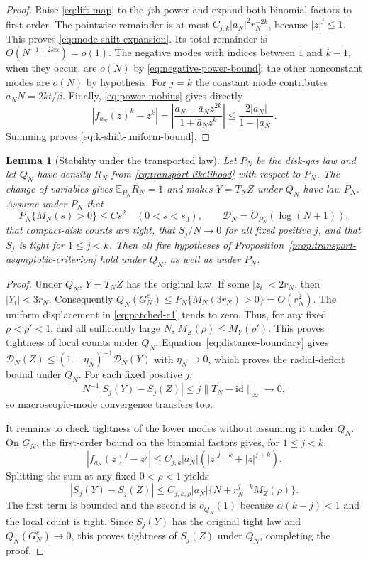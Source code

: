 \documentclass[11pt,a4paper]{article}
\numberwithin{equation}{section}
\newtheorem{lemma}[theorem]{Lemma}
\theoremstyle{definition}
\theoremstyle{remark}
\begin{document}
\begin{proof}
Raise \eqref{eq:lift-map} to the $j$th power and expand both binomial
factors to first order. The pointwise remainder is at most
$C_{j,k}|a_N|^2r_N^{-2k}$, because $|z|^j\leq1$.
This proves \eqref{eq:mode-shift-expansion}. Its total remainder is
$O(N^{-1+2k\alpha})=o(1)$. The negative modes with indices between
$1$ and $k-1$, when they occur, are $o(N)$ by
\eqref{eq:negative-power-bound}; the other nonconstant modes are
$o(N)$ by hypothesis. For $j=k$ the constant mode contributes
$a_NN=2kt/\beta$.
Finally, \eqref{eq:power-mobius} gives directly
\[
 |f_{a_N}(z)^k-z^k|
 =\left|\frac{a_N-\bar a_Nz^{2k}}{1+\bar a_Nz^k}\right|
 \leq\frac{2|a_N|}{1-|a_N|}.
\]
Summing proves \eqref{eq:k-shift-uniform-bound}.
\end{proof}

\begin{lemma}[Stability under the transported law]
\label{lem:transported-controls}
Let $P_N$ be the disk-gas law and let $Q_N$ have density
$R_N$ from \eqref{eq:transport-likelihood} with respect to $P_N$.
The change of variables gives $\mathbb E_{P_N}R_N=1$ and makes
$Y=T_N Z$ under $Q_N$ have law $P_N$. Assume under $P_N$ that
\[
 P_N\{M_N(s)>0\}\leq C s^2\quad(0<s<s_0),\qquad
 \mathcal D_N=O_{P_N}(\log(N+1)),
\]
that compact-disk counts are tight, that $S_j/N\to0$ for all fixed
positive $j$, and that $S_j$ is tight for $1\leq j<k$.
Then all five hypotheses of
Proposition~\ref{prop:transport-asymptotic-criterion} hold under $Q_N$,
as well as under $P_N$.
\end{lemma}

\begin{proof}
Under $Q_N$, $Y=T_N Z$ has the original law. If some $|z_i|<2r_N$,
then $|Y_i|<3r_N$. Consequently
$Q_N(G_N^c)\leq P_N\{M_N(3r_N)>0\}=O(r_N^2)$.
The uniform displacement in \eqref{eq:patched-c1} tends to zero.
Thus, for any fixed $\rho<\rho'<1$, and all sufficiently large $N$,
$M_Z(\rho)\leq M_Y(\rho')$. This proves tightness of local counts
under $Q_N$. Equation~\eqref{eq:distance-boundary} gives
$\mathcal D_N(Z)\leq(1-\eta_N)^{-1}\mathcal D_N(Y)$ with $\eta_N\to0$, which proves
the radial-deficit bound under $Q_N$. For each fixed positive $j$,
\[
 N^{-1}|S_j(Y)-S_j(Z)|
 \leq j\|T_N-\mathrm{id}\|_\infty\longrightarrow0,
\]
so macroscopic-mode convergence transfers too.

It remains to check tightness of the lower modes without assuming it
under $Q_N$. On $G_N$, the first-order bound on the binomial factors
gives, for $1\leq j<k$,
\[
 |f_{a_N}(z)^j-z^j|
 \leq C_{j,k}|a_N|(|z|^{j-k}+|z|^{j+k}).
\]
Splitting the sum at any fixed $0<\rho<1$ yields
\[
 |S_j(Y)-S_j(Z)|
 \leq C_{j,k,\rho}|a_N|
                   \{N+r_N^{j-k}M_Z(\rho)\}.
\]
The first term is bounded and the second is $o_{Q_N}(1)$ because
$\alpha(k-j)<1$ and the local count is tight. Since $S_j(Y)$ has the
original tight law and $Q_N(G_N^c)\to0$, this proves tightness of
$S_j(Z)$ under $Q_N$, completing the proof.
\end{proof}
\end{document}

